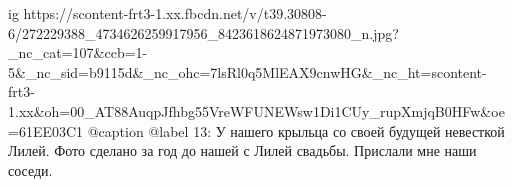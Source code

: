  
 
 
 
 

\ifcmt
  ig https://scontent-frt3-1.xx.fbcdn.net/v/t39.30808-6/272229388_4734626259917956_8423618624871973080_n.jpg?_nc_cat=107&ccb=1-5&_nc_sid=b9115d&_nc_ohc=7lsRl0q5MlEAX9cnwHG&_nc_ht=scontent-frt3-1.xx&oh=00_AT88AuqpJfhbg55VreWFUNEWsw1Di1CUy_rupXmjqB0HFw&oe=61EE03C1
  @caption @label 13: У нашего крыльца со своей будущей невесткой Лилей. Фото сделано за год до нашей с Лилей свадьбы. Прислали мне наши соседи.
\fi
